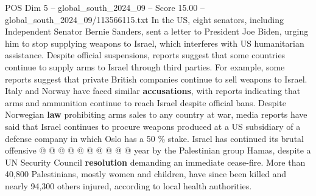 \begin{textsample}{POS Dim 5 – global\_south\_2024\_09 – Score 15.00 – global\_south\_2024\_09/113566115.txt}
In the US, eight senators, including Independent Senator Bernie Sanders, sent a letter to President Joe Biden, urging him to stop supplying weapons to Israel, which interferes with US humanitarian assistance.
Despite official suspensions, reports suggest that some countries continue to supply arms to Israel through third parties.
For example, some reports suggest that private British companies continue to sell weapons to Israel.
Italy and Norway have faced similar \textbf{accusations}, with reports indicating that arms and ammunition continue to reach Israel despite official bans.
Despite Norwegian \textbf{law} prohibiting arms sales to any country at war, media reports have said that Israel continues to procure weapons produced at a US subsidiary of a defense company in which Oslo has a 50 \% stake.
Israel has continued its brutal offensive @ @ @ @ @ @ @ @ @ @ year by the Palestinian group Hamas, despite a UN Security Council \textbf{resolution} demanding an immediate cease-fire.
More than 40,800 Palestinians, mostly women and children, have since been killed and nearly 94,300 others injured, according to local health authorities.

\end{textsample}
